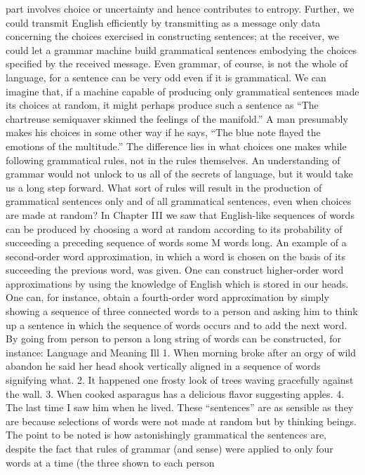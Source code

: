 {{{part involves choice or uncertainty and hence contributes to entropy.
Further, we could transmit English efficiently by transmitting
as a message only data concerning the choices exercised in
constructing sentences; at the receiver, we could let a grammar
machine build grammatical sentences embodying the choices specified
by the received message.
Even grammar, of course, is not the whole of language, for a
sentence can be very odd even if it is grammatical. We can imagine
that, if a machine capable of producing only grammatical sentences
made its choices at random, it might perhaps produce such a sentence
as “The chartreuse semiquaver skinned the feelings of the
manifold.” A man presumably makes his choices in some other
way if he says, “The blue note flayed the emotions of the multitude.”
The difference lies in what choices one makes while following
grammatical rules, not in the rules themselves. An understanding
of grammar would not unlock to us all of the secrets of
language, but it would take us a long step forward.
What sort of rules will result in the production of grammatical
sentences only and of all grammatical sentences, even when choices
are made at random? In Chapter III we saw that English-like
sequences of words can be produced by choosing a word at random
according to its probability of succeeding a preceding sequence
of words some M words long. An example of a second-order
word approximation, in which a word is chosen on the basis of its
succeeding the previous word, was given.
One can construct higher-order word approximations by using
the knowledge of English which is stored in our heads. One can,
for instance, obtain a fourth-order word approximation by simply
showing a sequence of three connected words to a person and asking
him to think up a sentence in which the sequence of words
occurs and to add the next word. By going from person to person
a long string of words can be constructed, for instance:
Language and Meaning
Ill
1. When morning broke after an orgy of wild abandon he said
her head shook vertically aligned in a sequence of words signifying
what.
2. It happened one frosty look of trees waving gracefully against
the wall.
3. When cooked asparagus has a delicious flavor suggesting
apples.
4. The last time I saw him when he lived.
These “sentences” are as sensible as they are because selections
of words were not made at random but by thinking beings. The
point to be noted is how astonishingly grammatical the sentences
are, despite the fact that rules of grammar (and sense) were applied
to only four words at a time (the three shown to each person
}}}
